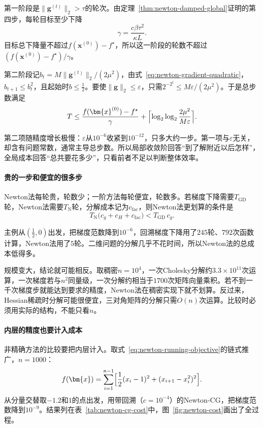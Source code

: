 第一阶段是$\lVert\bm{g}^{(t)}\rVert_2>\tau$的轮次。由定理~\ref{thm:newton-damped-global}证明的第四步，每轮目标至少下降
\[
 \gamma=\frac{c\beta\tau^2}{\kappa L}.
\]
目标总下降量不超过$f(\bm{x}^{(0)})-f^\star$，所以这一阶段的轮数不超过$(f(\bm{x}^{(0)})-f^\star)/\gamma$。

第二阶段记$b_t=M\lVert\bm{g}^{(t)}\rVert_2/(2\mu^2)$，由式~\eqref{eq:newton-gradient-quadratic}，$b_{t+1}\leq b_t^2$，且起始时$b\leq\tfrac12$。要使$\lVert\bm{g}\rVert_2\leq\varepsilon$，只需$2^{-2^t}\leq M\varepsilon/(2\mu^2)$。于是总步数满足
\begin{equation}
 T\leq\frac{f(\bm{x}^{(0)})-f^\star}{\gamma}+\Bigl\lceil\log_2\log_2\frac{2\mu^2}{M\varepsilon}\Bigr\rceil.
 \label{eq:newton-total-iterations}
\end{equation}

第二项随精度增长极慢：$\varepsilon$从$10^{-6}$收紧到$10^{-12}$，只多大约一步。第一项与$\varepsilon$无关，却含有问题常数，通常主导总步数。所以局部收敛阶回答“到了解附近以后怎样”，全局成本回答“总共要花多少”，只看前者不足以判断整体效率。

\paragraph{贵的一步和便宜的很多步}
Newton法每轮贵，轮数少；一阶方法每轮便宜，轮数多。若梯度下降需要$T_{\mathrm{GD}}$轮，Newton法需要$T_{\mathrm{N}}$轮，分解成本记为$c_{\mathrm{fac}}$，则Newton法更划算的条件是
\begin{equation}
 T_{\mathrm{N}}\bigl(c_g+c_H+c_{\mathrm{fac}}\bigr)<T_{\mathrm{GD}}\,c_g.
 \label{eq:newton-breakeven}
\end{equation}

主例从$(\tfrac12,0)$出发，把梯度范数降到$10^{-6}$，回溯梯度下降用了$245$轮、$792$次函数计算，Newton法用了$5$轮。二维问题的分解几乎不花时间，所以Newton法的总成本低得多。

规模变大，结论就可能相反。取稠密$n=10^4$，一次Cholesky分解约$3.3\times10^{11}$次运算，一次梯度若与$n^2$同量级，一次分解约相当于$1700$次矩阵向量乘积。若不到一千次梯度步就能达到要求的精度，Newton法在稠密实现下就不划算。反过来，Hessian稀疏时分解可能很便宜，三对角矩阵的分解只需$O(n)$次运算。比较时必须用实际的结构，不能只看$n$。

\paragraph{内层的精度也要计入成本}
非精确方法的比较要把内层计入。取式~\eqref{eq:newton-running-objective}的链式推广，$n=1000$：
\begin{equation}
 f(\bm{x})=\sum_{i=1}^{n-1}\Bigl[\frac12(x_i-1)^2+(x_{i+1}-x_i^2)^2\Bigr].
 \label{eq:newton-chain-objective}
\end{equation}
从分量交替取$-1.2$和$1$的点出发，用带回溯（$c=10^{-4}$）的Newton-CG，把梯度范数降到$10^{-9}$。结果列在表~\ref{tab:newton-cg-cost}中，图~\ref{fig:newton-cost}画出了全过程。

